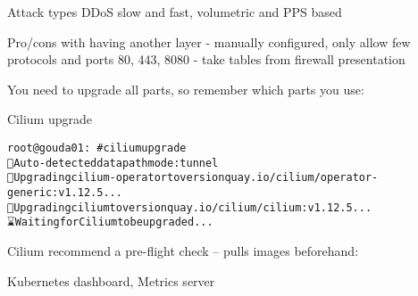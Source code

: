 \documentclass[Screen16to9,17pt]{foils}
\begin{document}
\begin{list2}
\item Attack types DDoS slow and fast, volumetric and PPS based
\item Pro/cons with having another layer - manually configured, only allow few protocols and ports 80, 443, 8080
- take tables from firewall presentation
\end{list2}




\begin{list2}
\item
\end{list2}



\begin{quote}

\end{quote}

You need to upgrade all parts, so remember which parts you use:
\begin{list2}
\item
\item Cilium upgrade
\end{list2}

\slide{}


\begin{alltt}
root@gouda01:~# cilium upgrade
🔮 Auto-detected datapath mode: tunnel
🚀 Upgrading cilium-operator to version quay.io/cilium/operator-generic:v1.12.5...
🚀 Upgrading cilium to version quay.io/cilium/cilium:v1.12.5...
⌛ Waiting for Cilium to be upgraded...

\end{alltt}

\begin{list2}
    \item
\end{list2}

Cilium recommend a pre-flight check -- pulls images beforehand:\\


\begin{list2}
\item Kubernetes dashboard, Metrics server
\end{list2}
\end{document}
